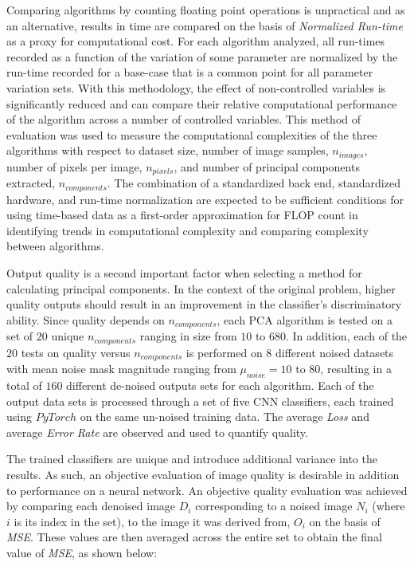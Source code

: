 \documentclass[12pt]{article}
\begin{document}
    Comparing algorithms by counting floating point operations is unpractical and as an alternative, results in time are compared on the basis of \textit{Normalized Run-time} as a proxy for computational cost. For each algorithm analyzed, all run-times recorded as a function of the variation of some parameter are normalized by the run-time recorded for a base-case that is a common point for all parameter variation sets. With this methodology, the effect of non-controlled variables is significantly reduced and can compare their relative computational performance of the algorithm across a number of controlled variables. This method of evaluation was used to measure the computational complexities of the three algorithms with respect to dataset size, number of image samples, $n_{images}$, number of pixels per image, $n_{pixels}$, and number of principal components extracted, $n_{components}$. The combination of a standardized back end, standardized hardware, and run-time normalization are expected to be sufficient conditions for using time-based data as a first-order approximation for FLOP count in identifying trends in computational complexity and comparing complexity between algorithms.

    Output quality is a second important factor when selecting a method for calculating principal components. In the context of the original problem, higher quality outputs should result in an improvement in the classifier's discriminatory ability. Since quality depends on $n_{components}$, each PCA algorithm is tested on a set of $20$ unique $n_{components}$ ranging in size from $10$ to $680$. In addition, each of the $20$ tests on quality versus $n_{components}$ is performed on $8$ different noised datasets with mean noise mask magnitude ranging from $\mu_{noise} = 10$ to $80$, resulting in a total of $160$ different de-noised outputs sets for each algorithm. Each of the output data sets is processed through a set of five CNN classifiers, each trained using $PyTorch$ on the same un-noised training data. The average \textit{Loss} and average \textit{Error Rate} are observed and used to quantify quality.

    The trained classifiers are unique and introduce additional variance into the results. As such, an objective evaluation of image quality is desirable in addition to performance on a neural network. An objective quality evaluation was achieved by comparing each denoised image $D_i$ corresponding to a noised image $N_i$ (where $i$ is its index in the set), to the image it was derived from, $O_i$ on the basis of \textit{MSE}. These values are then averaged across the entire set to obtain the final value of \textit{MSE}, as shown below:
\end{document}
